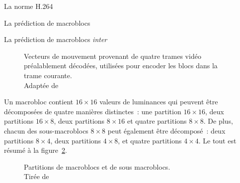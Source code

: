 \begin{chapter}{La norme H.264}
\begin{section}{La prédiction de macroblocs}
\begin{subsection}{La prédiction de macroblocs \textit{inter}}
\begin{figure}
\centering {}
\caption[Vecteurs de mouvement utilisées pour encoder une trame]{Vecteurs de
mouvement provenant de quatre trames vidéo préalablement décodées, utilisées
pour encoder les blocs dans la trame courante. \\Adaptée de
\citet[p.~570]{Wiegand2003}}
\label{fig-MultiPicture}
\end{figure}

Un macrobloc contient $16 \times 16$ valeurs de luminances qui peuvent être
décomposées de quatre manières distinctes~: une partition $16 \times 16$, deux
partitions $16 \times 8$, deux partitions $8 \times 16$ et quatre partitions $8
\times 8$. De plus, chacun des sous-macroblocs $8 \times 8$ peut également être
décomposé~: deux partitions $8 \times 4$, deux partitions $4 \times 8$, et
quatre partitions  $4 \times 4$. Le tout est résumé à la
figure~\ref{fig-MacroblockPartitions}.

\begin{figure}
\centering {}
\caption[Partitions de macroblocs et de sous macroblocs]{Partitions de
macroblocs et de sous macroblocs. \\Tirée de \citet[p.~569]{Wiegand2003}}
\label{fig-MacroblockPartitions}
\end{figure}


\end{subsection}
\end{section}
\end{chapter}
